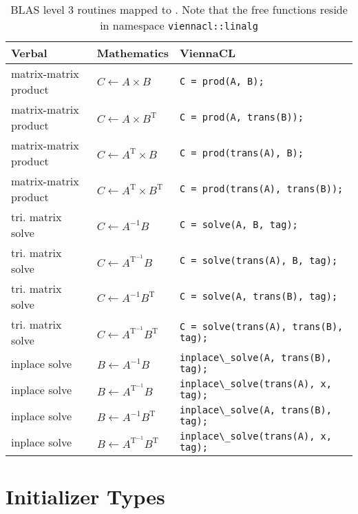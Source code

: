 \begin{table}[tb]
\begin{center}
\renewcommand{\arraystretch}{1.2}
\begin{tabular}{p{4cm}|l|p{7.5cm}}
Verbal & Mathematics & ViennaCL\\
\hline
matrix-matrix product & $C \leftarrow A \times B$ & \lstinline|C = prod(A, B);| \\
matrix-matrix product & $C \leftarrow A \times B^\mathrm{T}$ & \lstinline|C = prod(A, trans(B));| \\
matrix-matrix product & $C \leftarrow A^\mathrm{T} \times B$ & \lstinline|C = prod(trans(A), B);| \\
matrix-matrix product & $C \leftarrow A^\mathrm{T} \times B^\mathrm{T}$ & \lstinline|C = prod(trans(A), trans(B));| \\
\hline
tri. matrix solve & $C \leftarrow A^{-1} B$ & \lstinline|C = solve(A, B, tag);| \\
tri. matrix solve & $C \leftarrow A^\mathrm{T^{-1}} B$ & \lstinline|C = solve(trans(A), B, tag);| \\
tri. matrix solve & $C \leftarrow A^{-1} B^\mathrm{T}$ & \lstinline|C = solve(A, trans(B), tag);| \\
tri. matrix solve & $C \leftarrow A^\mathrm{T^{-1}} B^\mathrm{T}$ & \lstinline|C = solve(trans(A), trans(B), tag);| \\
%
inplace solve & $B \leftarrow A^{-1} B$ & \lstinline|inplace\_solve(A, trans(B), tag);| \\
inplace solve & $B \leftarrow A^\mathrm{T^{-1}} B$ & \lstinline|inplace\_solve(trans(A), x, tag);| \\
inplace solve & $B \leftarrow A^{-1} B^\mathrm{T}$ & \lstinline|inplace\_solve(A, trans(B), tag);| \\
inplace solve & $B \leftarrow A^\mathrm{T^{-1}} B^\mathrm{T}$ & \lstinline|inplace\_solve(trans(A), x, tag);| \\
\end{tabular}
\caption{BLAS level 3 routines mapped to \ViennaCL. Note that the free functions
reside in namespace \texttt{viennacl::linalg}}
\label{tab:blas-level-3}
\end{center}
\end{table}

\section{Initializer Types}


